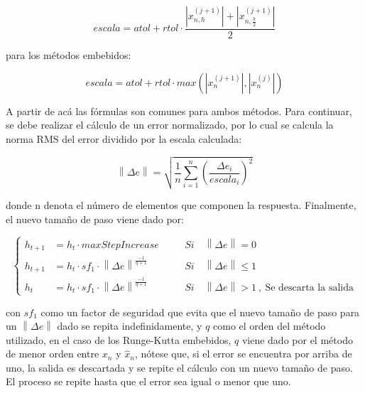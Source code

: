                 \begin{equation}\label{eq:escalaDos}
                    escala = atol + rtol \cdot \frac{\left|x_{n,h}^{(j+1)}\right| + \left|x_{n,\frac{h}{2}}^{(j+1)}\right|}{2}
                \end{equation}

                \noindent para los métodos embebidos:

                \begin{equation}\label{eq:escalaEmbebidos}
                    escala = atol + rtol \cdot max\left(\left| x_n^{(j+1)}\right|,\left| x_n^{(j)}\right|\right)
                \end{equation}
        
                A partir de acá las fórmulas son comunes para ambos métodos. Para continuar, se debe realizar el cálculo de un error normalizado, por lo cual se calcula la norma RMS del error dividido por la escala calculada:

                \begin{equation}\label{eq:ErrorNormalizado}
                    \left\lVert \Delta e\right\rVert  = \sqrt{\frac{1}{n} \sum_{i=1}^{n} \left(\frac{\Delta e_i}{escala_i}\right)^2}
                \end{equation}

                \noindent donde n denota el número de elementos que componen la respuesta. Finalmente, el nuevo tamaño de paso viene dado por:
                
                \begin{equation}\label{eq:casosStep}
                    \left\{
                    \begin{aligned}
                        h_{t+1} &= h_{t}\cdot maxStepIncrease &\quad &Si \quad \left\lVert \Delta e\right\rVert  = 0\\
                        h_{t+1} &= h_{t}\cdot sf_1 \cdot \left\lVert \Delta e\right\rVert ^{\frac{-1}{q+1}}  &\quad &Si \quad \left\lVert \Delta e\right\rVert  \leq 1 \\
                        h_{t} &= h_{t}\cdot sf_1 \cdot \left\lVert \Delta e\right\rVert ^{\frac{-1}{q+1}}  &\quad &Si \quad \left\lVert \Delta e\right\rVert  > 1 \ ,\ \text{Se descarta la salida}
                    \end{aligned}\right.
                \end{equation}
                
                \noindent con $sf_1$ como un factor de seguridad que evita que el nuevo tamaño de paso para un $\left\lVert \Delta e\right\rVert $ dado se repita indefinidamente, y $q$ como el orden del método utilizado, en el caso de los Runge-Kutta embebidos, $q$ viene dado por el método de menor orden entre $x_n$ y $\hat{x}_n$, nótese que, si el error se encuentra por arriba de uno, la salida es descartada y se repite el cálculo con un nuevo tamaño de paso. El proceso se repite hasta que el error sea igual o menor que uno.
    
